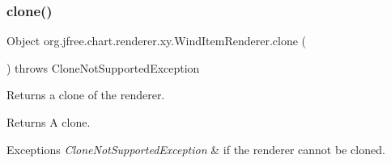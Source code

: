 \subsubsection{\texorpdfstring{clone()}{clone()}}
{\footnotesize\ttfamily Object org.\+jfree.\+chart.\+renderer.\+xy.\+Wind\+Item\+Renderer.\+clone (\begin{DoxyParamCaption}{ }\end{DoxyParamCaption}) throws Clone\+Not\+Supported\+Exception}

Returns a clone of the renderer.

\begin{DoxyReturn}{Returns}
A clone.
\end{DoxyReturn}

\begin{DoxyExceptions}{Exceptions}
{\em Clone\+Not\+Supported\+Exception} & if the renderer cannot be cloned. \\
\hline
\end{DoxyExceptions}
\mbox{\label{classorg_1_1jfree_1_1chart_1_1renderer_1_1xy_1_1_wind_item_renderer_aaec0be3d285a25179399bef29cfb9812}} 

